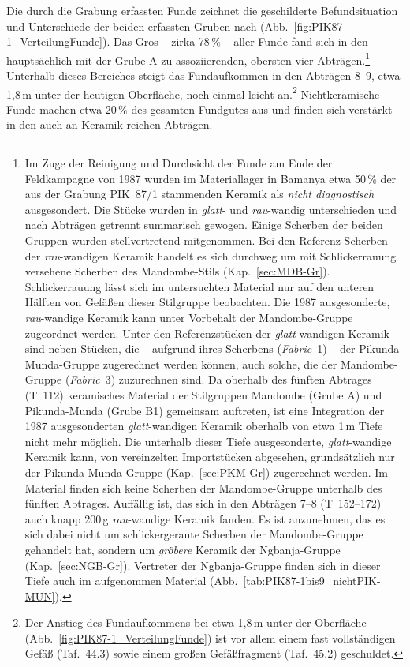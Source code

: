 \vspace{1em}
\noindent 
Die durch die Grabung erfassten Funde zeichnet die geschilderte Befundsituation und Unterschiede der beiden erfassten Gruben nach (Abb.~\ref{fig:PIK87-1_VerteilungFunde}). Das Gros -- zirka 78\,\% -- aller Funde fand sich in den hauptsächlich mit der Grube A zu assoziierenden, obersten vier Abträgen.\footnote{Im Zuge der Reinigung und Durchsicht der Funde am Ende der Feldkampagne von 1987 wurden im Materiallager in Bamanya etwa 50\,\% der aus der Grabung PIK~87/1 stammenden Keramik als \textit{nicht diagnostisch} ausgesondert. Die Stücke wurden in \textit{glatt}- und \textit{rau}-wandig unterschieden und nach Abträgen getrennt summarisch gewogen. Einige Scherben der beiden Gruppen wurden stellvertretend mitgenommen. Bei den Referenz-Scherben der \textit{rau}-wandigen Keramik handelt es sich durchweg um mit Schlickerrauung versehene Scherben des Mandombe-Stils (Kap.~\ref{sec:MDB-Gr}). Schlickerrauung lässt sich im untersuchten Material nur auf den unteren Hälften von Gefäßen dieser Stilgruppe beobachten. Die 1987 ausgesonderte, \textit{rau}-wandige Keramik kann unter Vorbehalt der Mandombe-Gruppe zugeordnet werden. Unter den Referenzstücken der \textit{glatt}-wandigen Keramik sind neben Stücken, die -- aufgrund ihres Scherbens (\textit{Fabric}~1) -- der Pikunda-Munda-Gruppe zugerechnet werden können, auch solche, die der Mandombe-Gruppe (\textit{Fabric}~3) zuzurechnen sind. Da oberhalb des fünften Abtrages (T~112) keramisches Material der Stilgruppen Mandombe (Grube A) und Pikunda-Munda (Grube B1) gemeinsam auftreten, ist eine Integration der 1987 ausgesonderten \textit{glatt}-wandigen Keramik oberhalb von etwa 1\,m Tiefe nicht mehr möglich. Die unterhalb dieser Tiefe ausgesonderte, \textit{glatt}-wandige Keramik kann, von vereinzelten Importstücken abgesehen, grundsätzlich nur der Pikunda-Munda-Gruppe (Kap.~\ref{sec:PKM-Gr}) zugerechnet werden. Im Material finden sich keine Scherben der Mandombe-Gruppe unterhalb des fünften Abtrages. Auffällig ist, das sich in den Abträgen 7--8 (T~152--172) auch knapp 200\,g \textit{rau}-wandige Keramik fanden. Es ist anzunehmen, das es sich dabei nicht um schlickergeraute Scherben der Mandombe-Gruppe gehandelt hat, sondern um \textit{gröbere} Keramik der \mbox{Ngbanja}-Gruppe (Kap.~\ref{sec:NGB-Gr}). Vertreter der \mbox{Ngbanja}-Gruppe finden sich in dieser Tiefe auch im aufgenommen Material (Abb.~\ref{tab:PIK87-1bis9_nichtPIK-MUN}).} Unterhalb dieses Bereiches steigt das Fundaufkommen in den Abträgen 8--9, etwa 1,8\,m unter der heutigen Oberfläche, noch einmal leicht an.\footnote{Der Anstieg des Fundaufkommens bei etwa 1,8\,m unter der Oberfläche (Abb.~\ref{fig:PIK87-1_VerteilungFunde}) ist vor allem einem fast vollständigen Gefäß (Taf.~44.3) sowie einem großen Gefäßfragment (Taf.~45.2) geschuldet.} Nichtkeramische Funde machen etwa 20\,\% des gesamten Fundgutes aus und finden sich verstärkt in den auch an Keramik reichen Abträgen.

